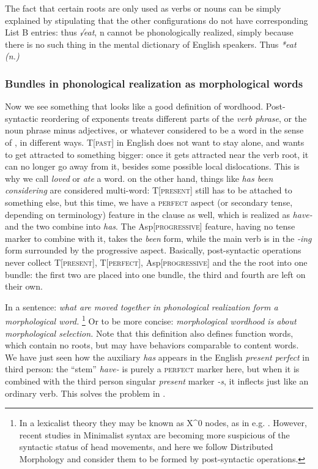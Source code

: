 \documentclass[a4paper, oneside, scheme=plain, 12pt]{article}
\newcommand*{\term}[1]{\emph{#1}}
\newcommand{\form}[1]{\emph{#1}}
\newcommand*{\category}[1]{\textsc{#1}}
\begin{document}
The fact that certain roots are only used as verbs or nouns
can be simply explained by stipulating that the other configurations do not have corresponding List B entries:
thus \form{√eat}, n cannot be phonologically realized,
simply because there is no such thing in the mental dictionary of English speakers.
Thus \form{*eat (n.)}

\subsubsection{Bundles in phonological realization as morphological words}\label{sec:morphological-wordhood-production}

Now we see something that looks like a good definition of wordhood.
Post-syntactic reordering of exponents treats different parts of the \term{verb phrase},
or the noun phrase minus adjectives, or whatever considered to be a word in the sense of , in different ways.
T[\category{past}] in English does not want to stay alone,
and wants to get attracted to something bigger:
once it gets attracted near the verb root,
it can no longer go away from it, besides some possible local dislocations.
This is why we call \form{loved} or \form{ate} a word.
on the other hand, things like \form{has been considering} are considered multi-word:
T[\category{present}] still has to be attached to something else,
but this time, we have a \category{perfect} aspect (or secondary tense, depending on terminology) feature in the clause as well,
which is realized as \form{have-} and the two combine into \form{has}.
The Asp[\category{progressive}] feature, having no tense marker to combine with it,
takes the \form{been} form, while the main verb is in the \form{-ing} form surrounded by the progressive aspect.
Basically, post-syntactic operations never collect T[\category{present}], T[\category{perfect}], Asp[\category{progressive}] and the the root into one bundle:
the first two are placed into one bundle, the third and fourth are left on their own.

In a sentence: \form{what are moved together in phonological realization form a morphological word.}%
\footnote{
    In a lexicalist theory they may be known as X^0 nodes, as in e.g. \citet{bickel2007free}.
    However, recent studies in Minimalist syntax are becoming more suspicious
    of the syntactic status of head movements,
    and here we follow Distributed Morphology and consider them to be formed by 
    post-syntactic operations.
}
Or to be more concise: \form{morphological wordhood is about morphological selection.}
Note that this definition also defines function words,
which contain no roots, but may have behaviors comparable to content words.
We have just seen how the auxiliary \form{has} appears in the English \form{present perfect} in third person:
the ``stem'' \form{have-} is purely a \category{perfect} marker here,
but when it is combined with the third person singular \form{present} marker \form{-s},
it inflects just like an ordinary verb.
This solves the problem in .
\end{document}
